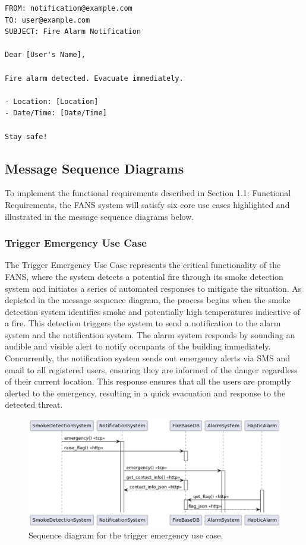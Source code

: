 \begin{lstlisting}[label={lst:email},caption={Email notification for detected emergency in FANS.}]
FROM: notification@example.com
TO: user@example.com
SUBJECT: Fire Alarm Notification

Dear [User's Name],

Fire alarm detected. Evacuate immediately.

- Location: [Location]
- Date/Time: [Date/Time]

Stay safe!
\end{lstlisting}

\subsection{Message Sequence Diagrams}

To implement the functional requirements described in Section 1.1: Functional Requirements, the FANS system will
satisfy six core use cases highlighted and illustrated in the message sequence diagrams below.

\subsubsection{Trigger Emergency Use Case}

The Trigger Emergency Use Case represents the critical functionality of the FANS, where the system detects a potential
fire through its smoke detection system and initiates a series of automated responses to mitigate the situation. As
depicted in the message sequence diagram, the process begins when the smoke detection system identifies smoke and
potentially high temperatures indicative of a fire. This detection triggers the system to send a notification to the
alarm system and the notification system. The alarm system responds by sounding an audible and visible alert to notify
occupants of the building immediately. Concurrently, the notification system sends out emergency alerts via SMS and
email to all registered users, ensuring they are informed of the danger regardless of their current location. This
response ensures that all the users are promptly alerted to the emergency, resulting in a quick evacuation and response
to the detected threat.

\begin{figure}[H]
    \centering
    \includegraphics[width=\linewidth]{../assets/TriggerEmergencyUseCaseSequenceDiagram.png}
    \caption{Sequence diagram for the trigger emergency use case.}
\end{figure}

